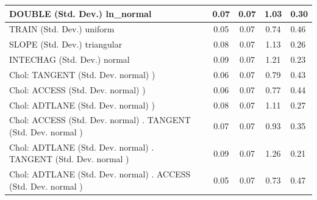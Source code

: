 \begin{table}
\begin{center}
\begin{tabular}{|l|l|c|c|c|l|}
			\hline
			DOUBLE (Std. Dev.) ln_normal &  & 0.07 & 0.07 & 1.03 & 0.30 \\
			\hline
			TRAIN (Std. Dev.) uniform &  & 0.05 & 0.07 & 0.74 & 0.46 \\
			\hline
			SLOPE (Std. Dev.) triangular &  & 0.08 & 0.07 & 1.13 & 0.26 \\
			\hline
			INTECHAG (Std. Dev.) normal &  & 0.09 & 0.07 & 1.21 & 0.23 \\
			\hline
			 Chol: TANGENT (Std. Dev. normal) ) &  & 0.06 & 0.07 & 0.79 & 0.43 \\
			\hline
			 Chol: ACCESS (Std. Dev. normal) ) &  & 0.06 & 0.07 & 0.77 & 0.44 \\
			\hline
			 Chol: ADTLANE (Std. Dev. normal) ) &  & 0.08 & 0.07 & 1.11 & 0.27 \\
			\hline
			 Chol: ACCESS (Std. Dev. normal) . TANGENT (Std. Dev.   normal ) &  & 0.07 & 0.07 & 0.93 & 0.35 \\
			\hline
			 Chol: ADTLANE (Std. Dev. normal) . TANGENT (Std. Dev.   normal ) &  & 0.09 & 0.07 & 1.26 & 0.21 \\
			\hline
			 Chol: ADTLANE (Std. Dev. normal) . ACCESS (Std. Dev.   normal ) &  & 0.05 & 0.07 & 0.73 & 0.47 \\
			\hline
		\end{tabular}
	\end{center}
\end{table}
